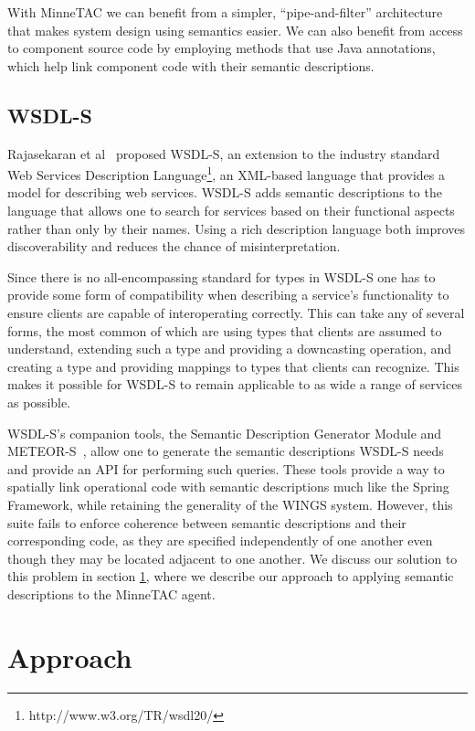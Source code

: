 \documentclass{article}
\begin{document}
With MinneTAC we can benefit from a simpler, ``pipe-and-filter'' architecture that makes system design using semantics easier.
We can also benefit from access to component source code by employing methods that use Java annotations, which help link component code with their semantic descriptions.

\subsection{WSDL-S}

Rajasekaran et al~\cite{rajasekaran2005enhancing} proposed WSDL-S, an extension to the industry standard Web Services Description Language\footnote{http://www.w3.org/TR/wsdl20/}, an XML-based language that provides a model for describing web services.
WSDL-S adds semantic descriptions to the language that allows one to search for services based on their functional aspects rather than only by their names.
Using a rich description language both improves discoverability and reduces the chance of misinterpretation.

Since there is no all-encompassing standard for types in WSDL-S one has to provide some form of compatibility when describing a service's functionality to ensure clients are capable of interoperating correctly.
This can take any of several forms, the most common of which are using types that clients are assumed to understand, extending such a type and providing a downcasting operation, and creating a type and providing mappings to types that clients can recognize.
This makes it possible for WSDL-S to remain applicable to as wide a range of services as possible.

WSDL-S's companion tools, the Semantic Description Generator Module and METEOR-S~\cite{rajasekaran2005enhancing}, allow one to generate the semantic descriptions WSDL-S needs and provide an API for performing such queries.
These tools provide a way to spatially link operational code with semantic descriptions much like the Spring Framework, while retaining the generality of the WINGS system.
However, this suite fails to enforce coherence between semantic descriptions and their corresponding code, as they are specified independently of one another even though they may be located adjacent to one another.
We discuss our solution to this problem in section \ref{sec:approach}, where we describe our approach to applying semantic descriptions to the MinneTAC agent.

\section{Approach}
\label{sec:approach}
\end{document}
